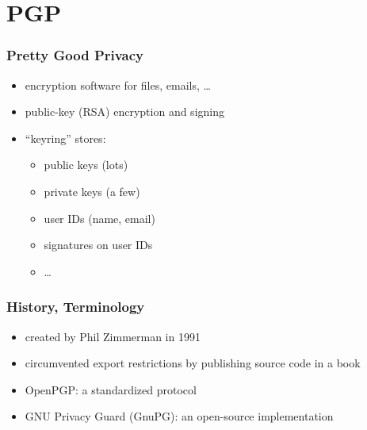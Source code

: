 \documentclass{beamer}
\begin{document}
\section{PGP}

\begin{frame}
  \frametitle{Pretty Good Privacy}

  \begin{itemize}
    \item encryption software for files, emails, \ldots
    \item public-key (RSA) encryption and signing
    \item ``keyring'' stores:
      \begin{itemize}
        \item public keys (lots)
        \item private keys (a few)
        \item user IDs (name, email)
        \item signatures on user IDs
        \item \ldots
      \end{itemize}
  \end{itemize}
\end{frame}

\begin{frame}
  \frametitle{History, Terminology}

  \begin{itemize}
    \item created by Phil Zimmerman in 1991
    \item circumvented export restrictions by publishing source code in a book
    \item OpenPGP: a standardized protocol
    \item GNU Privacy Guard (GnuPG): an open-source implementation
  \end{itemize}
\end{frame}
\end{document}
